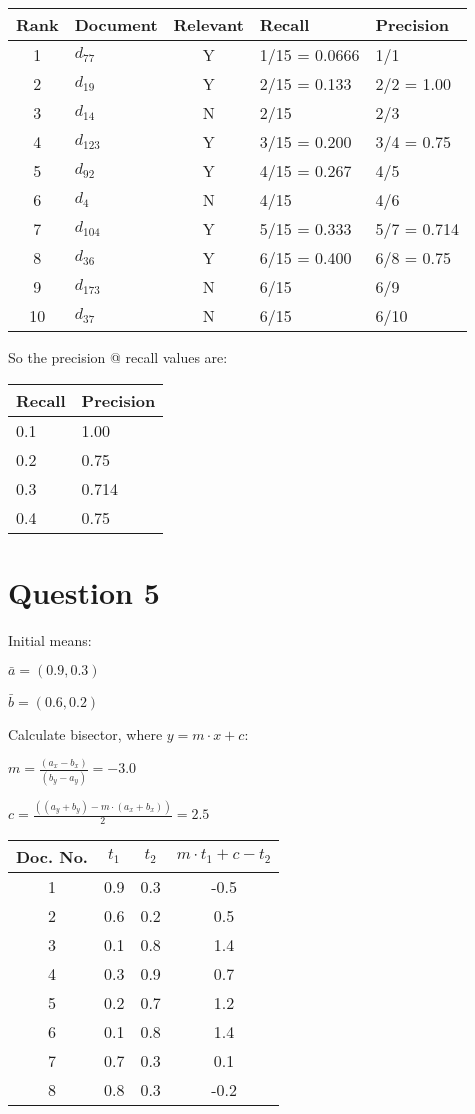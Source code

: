 \documentclass[11pt]{article}
\begin{document}
\begin{tabular}{c l c l l}
Rank & Document & Relevant & Recall & Precision \\
\hline
1 & $d_{77}$  & Y & 1/15 = 0.0666 & 1/1 \\
2 & $d_{19}$  & Y & 2/15 = 0.133  & 2/2 = 1.00 \\
3 & $d_{14}$  & N & 2/15          & 2/3 \\
4 & $d_{123}$ & Y & 3/15 = 0.200  & 3/4 = 0.75 \\
5 & $d_{92}$  & Y & 4/15 = 0.267  & 4/5 \\
6 & $d_{4}$   & N & 4/15          & 4/6 \\
7 & $d_{104}$ & Y & 5/15 = 0.333  & 5/7 = 0.714 \\
8 & $d_{36}$  & Y & 6/15 = 0.400  & 6/8 = 0.75 \\
9 & $d_{173}$ & N & 6/15          & 6/9 \\
10 & $d_{37}$ & N & 6/15          & 6/10 \\
\end{tabular}

So the precision @ recall values are:

\begin{tabular}{l l}
Recall & Precision \\
\hline
0.1 & 1.00 \\
0.2 & 0.75 \\
0.3 & 0.714 \\
0.4 & 0.75 \\
\end{tabular}

\section*{Question 5}

Initial means:

$\bar{a} = (0.9, 0.3)$

$\bar{b} = (0.6, 0.2)$

Calculate bisector, where $y = m \cdot x + c$:

$m = \frac{(a_x - b_x)}{(b_y - a_y)} = -3.0$

$c = \frac{((a_y+b_y) - m \cdot (a_x+b_x))}{2} = 2.5$

\begin{tabular}{c | c | c | c}
Doc. No. & $t_1$ & $t_2$ & $m \cdot t_1 + c - t_2$ \\
\hline
1 & 0.9 & 0.3 & -0.5 \\
2 & 0.6 & 0.2 & 0.5 \\
3 & 0.1 & 0.8 & 1.4 \\
4 & 0.3 & 0.9 & 0.7 \\
5 & 0.2 & 0.7 & 1.2 \\
6 & 0.1 & 0.8 & 1.4 \\
7 & 0.7 & 0.3 & 0.1 \\
8 & 0.8 & 0.3 & -0.2 \\
\end{tabular}
\end{document}
